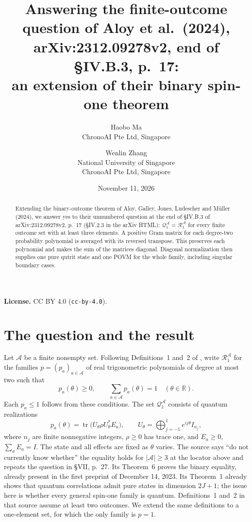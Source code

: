 \documentclass[11pt]{article}
\title{Answering the finite-outcome question of Aloy et al.\ (2024),\\
arXiv:2312.09278v2, end of \S IV.B.3, p.~17:\\
an extension of their binary spin-one theorem}
\author{Haobo Ma\\{\small ChronoAI Pte Ltd, Singapore}
\and Wenlin Zhang\\{\small National University of Singapore}\\
{\small ChronoAI Pte Ltd, Singapore}}
\date{November 11, 2026}
\newcommand{\R}{\mathbb R}
\newcommand{\tr}{\operatorname{tr}}
\begin{document}
\maketitle
\begin{abstract}
Extending the binary-outcome theorem of Aloy, Galley, Jones, Ludescher and
M\"uller (2024), we answer yes to their unnumbered question at the end of
\S IV.B.3 of arXiv:2312.09278v2, p.~17 (\S IV.2.3 in the arXiv HTML):
$\mathcal Q_1^{\mathcal A}=\mathcal R_1^{\mathcal A}$ for every finite
outcome set with at least three elements. A positive Gram matrix for each
degree-two probability polynomial is averaged with its reversed transpose.
This preserves each polynomial and makes the sum of the matrices diagonal.
Diagonal normalization then supplies one pure qutrit state and one POVM
for the whole family, including singular boundary cases.
\end{abstract}
\noindent\textbf{License.} CC BY 4.0 (\texttt{cc-by-4.0}).

\section{The question and the result}
Let $\mathcal A$ be a finite nonempty set. Following Definitions~1 and~2 of
\cite{AGJLM}, write $\mathcal R_1^{\mathcal A}$ for the families
$p=(p_a)_{a\in\mathcal A}$ of real trigonometric polynomials of degree at
most two such that
\begin{equation}\label{probability}
 p_a(\theta)\geq0,\qquad \sum_{a\in\mathcal A}p_a(\theta)=1
 \quad(\theta\in\R).
\end{equation}
Each $p_a\leq1$ follows from these conditions.
The set $\mathcal Q_1^{\mathcal A}$ consists of quantum realizations
\begin{equation}\label{born}
 p_a(\theta)=\tr\bigl(U_\theta\rho U_\theta^*E_a\bigr),\qquad
 U_\theta=\bigoplus_{j=-1}^{1}e^{ij\theta}I_{n_j},
\end{equation}
where $n_j$ are finite nonnegative integers, $\rho\geq0$ has trace one,
and $E_a\geq0$, $\sum_a E_a=I$. The state and all effects are fixed as
$\theta$ varies. The source says ``do not currently know whether'' the equality
holds for $|\mathcal A|\geq3$ at the locator above and repeats the question
in \S VII, p.~27. Its Theorem~6 proves the binary equality, already present
in the first preprint of December 14, 2023. Its Theorem~1
already shows that quantum correlations admit pure states in dimension
$2J+1$; the issue here is whether every general spin-one family is quantum.
Definitions~1 and~2 in that source assume at least two outcomes. We extend
the same definitions to a one-element set, for which the only family is $p=1$.
\end{document}
